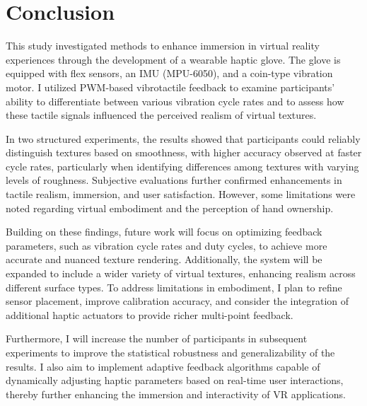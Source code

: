 \chapter{Conclusion} %

\label{Chapter6}

This study investigated methods to enhance immersion in virtual reality experiences through the development of a wearable haptic glove. The glove is equipped with flex sensors, an IMU (MPU-6050), and a coin-type vibration motor. I utilized PWM-based vibrotactile feedback to examine participants' ability to differentiate between various vibration cycle rates and to assess how these tactile signals influenced the perceived realism of virtual textures.

In two structured experiments, the results showed that participants could reliably distinguish textures based on smoothness, with higher accuracy observed at faster cycle rates, particularly when identifying differences among textures with varying levels of roughness. Subjective evaluations further confirmed enhancements in tactile realism, immersion, and user satisfaction. However, some limitations were noted regarding virtual embodiment and the perception of hand ownership.

Building on these findings, future work will focus on optimizing feedback parameters, such as vibration cycle rates and duty cycles, to achieve more accurate and nuanced texture rendering. Additionally, the system will be expanded to include a wider variety of virtual textures, enhancing realism across different surface types. To address limitations in embodiment, I plan to refine sensor placement, improve calibration accuracy, and consider the integration of additional haptic actuators to provide richer multi-point feedback. 

Furthermore, I will increase the number of participants in subsequent experiments to improve the statistical robustness and generalizability of the results. I also aim to implement adaptive feedback algorithms capable of dynamically adjusting haptic parameters based on real-time user interactions, thereby further enhancing the immersion and interactivity of VR applications.





